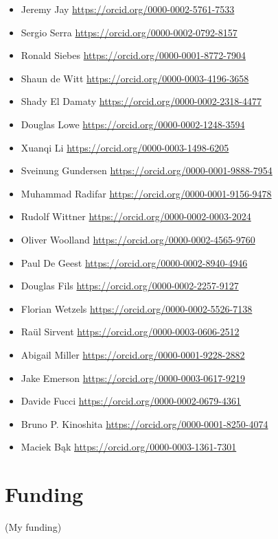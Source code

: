 \begin{itemize}
\item
  Jeremy Jay \url{https://orcid.org/0000-0002-5761-7533}
\item
  Sergio Serra \url{https://orcid.org/0000-0002-0792-8157}
\item
  Ronald Siebes \url{https://orcid.org/0000-0001-8772-7904}
\item
  Shaun de Witt \url{https://orcid.org/0000-0003-4196-3658}
\item
  Shady El Damaty \url{https://orcid.org/0000-0002-2318-4477}
\item
  Douglas Lowe \url{https://orcid.org/0000-0002-1248-3594}
\item
  Xuanqi Li \url{https://orcid.org/0000-0003-1498-6205}
\item
  Sveinung Gundersen \url{https://orcid.org/0000-0001-9888-7954}
\item
  Muhammad Radifar \url{https://orcid.org/0000-0001-9156-9478}
\item
  Rudolf Wittner \url{https://orcid.org/0000-0002-0003-2024}
\item
  Oliver Woolland \url{https://orcid.org/0000-0002-4565-9760}
\item
  Paul De Geest \url{https://orcid.org/0000-0002-8940-4946}
\item
  Douglas Fils \url{https://orcid.org/0000-0002-2257-9127}
\item
  Florian Wetzels \url{https://orcid.org/0000-0002-5526-7138}
\item
  Raül Sirvent \url{https://orcid.org/0000-0003-0606-2512}
\item
  Abigail Miller \url{https://orcid.org/0000-0001-9228-2882}
\item
  Jake Emerson \url{https://orcid.org/0000-0003-0617-9219}
\item
  Davide Fucci \url{https://orcid.org/0000-0002-0679-4361}
\item
  Bruno P. Kinoshita \url{https://orcid.org/0000-0001-8250-4074}
\item
  Maciek Bąk \url{https://orcid.org/0000-0003-1361-7301}  

\end{itemize}



\section{Funding}

(My funding)



